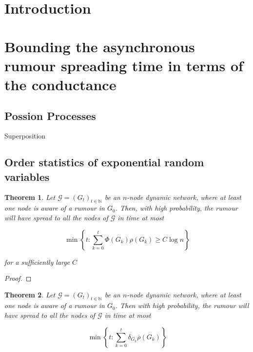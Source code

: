 \documentclass[a4paper,11pt]{article}
\newtheorem{theorem}{Theorem}[section]
\theoremstyle{definition}
\newcommand*\comp[1]{\overline{#1}}
\begin{document}
\section{Introduction}




\section{Bounding the asynchronous rumour spreading time in terms of the conductance}

\subsection{Possion Processes}

Superposition

\subsection{Order statistics of exponential random variables}

\newcommand{\ModelIntro}{
	Let $\mathcal{G} = (G_t)_{t \in \mathbb{N}}$ be an $n$-node dynamic network, where at least one node is aware of a rumour in $G_0$.
}

\begin{theorem}
	\ModelIntro Then, with high probability, the rumour will have spread to all the nodes of $\mathcal{G}$ in time at most

	$$
		\min \left\{t : \sum_{k=0}^t \Phi(G_k)\rho(G_k) \geq C \log n \right\} 
	$$

	\noindent
	for a sufficiently large $C$
\end{theorem}

\begin{proof}

\end{proof}

\begin{theorem}
	\ModelIntro Then with high probability, the rumour will have spread to all the nodes of $\mathcal{G}$ in time at most 

	$$ 
		\min \left\{ t : \sum_{k=0}^t \delta_{G_k} \comp{\rho}(G_k) \right\}
	$$

\end{theorem}
\end{document}
